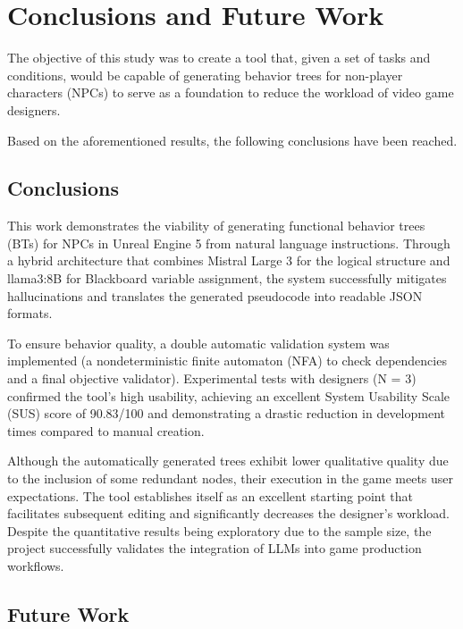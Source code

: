 \chapter*{Conclusions and Future Work}
\label{cap:conclusions}

The objective of this study was to create a tool that, given a set of tasks and conditions, would be capable of generating behavior trees for non-player characters (NPCs) to serve as a foundation to reduce the workload of video game designers.

Based on the aforementioned results, the following conclusions have been reached.

\section{Conclusions}

This work demonstrates the viability of generating functional behavior trees (BTs) for NPCs in Unreal Engine 5 from natural language instructions.
Through a hybrid architecture that combines Mistral Large 3 for the logical structure and llama3:8B for Blackboard variable assignment, the system successfully mitigates hallucinations and translates the generated pseudocode into readable JSON formats.

To ensure behavior quality, a double automatic validation system was implemented (a nondeterministic finite automaton (NFA) to check dependencies and a final objective validator).
Experimental tests with designers (N = 3) confirmed the tool's high usability, achieving an excellent System Usability Scale (SUS) score of 90.83/100 and demonstrating a drastic reduction in development times compared to manual creation.

Although the automatically generated trees exhibit lower qualitative quality due to the inclusion of some redundant nodes, their execution in the game meets user expectations.
The tool establishes itself as an excellent starting point that facilitates subsequent editing and significantly decreases the designer's workload.
Despite the quantitative results being exploratory due to the sample size, the project successfully validates the integration of LLMs into game production workflows.

\section{Future Work}

